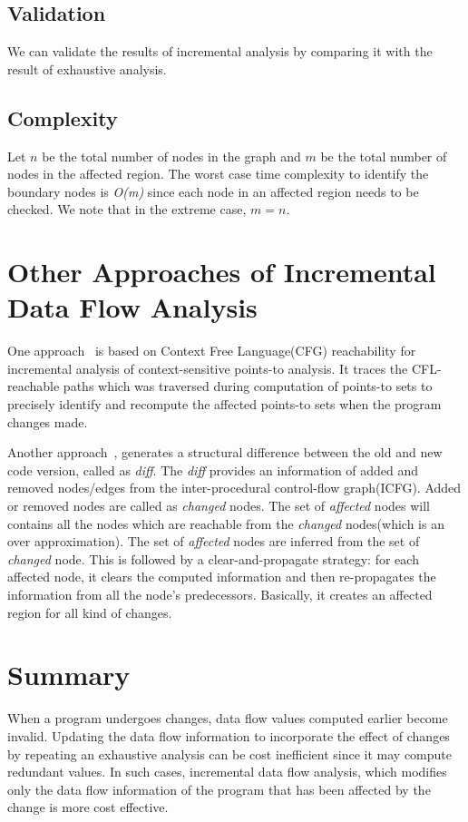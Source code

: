 \documentclass[11pt,a4paper,openright]{report}
\begin{document}

\subsection{Validation}
We can validate the results of incremental analysis by comparing it with the result of exhaustive analysis. 


\subsection{Complexity}
Let $n$ be the total number of nodes in the graph and $m$ be the total number of nodes in the affected region.
The worst case time complexity to identify the boundary nodes is \textit{O(m)} since each node in an affected region needs
to be checked.
We note that in the extreme case, $m = n$.

\section{Other Approaches of Incremental Data Flow Analysis}
One approach~\cite{inc1} is based on Context Free Language(CFG) reachability for incremental analysis of context-sensitive points-to analysis. It traces the CFL-reachable
paths which was traversed during computation of points-to sets to precisely identify and recompute the affected points-to sets when the program changes made. 

Another approach~\cite{inc2}, generates a structural difference between the old and new code version, called as \textit{diff}. The \textit{diff} 
provides an information of added and removed nodes/edges from the inter-procedural control-flow graph(ICFG). Added or removed nodes are called as
\textit{changed} nodes. The set of \textit{affected} nodes will contains all the nodes which are reachable from the \textit{changed} nodes(which is an over approximation). The set of \textit{affected} nodes are inferred from the set of \textit{changed} node. 
This is followed by a clear-and-propagate strategy: for each affected node, it clears the  computed information
and then re-propagates the information from all the node’s predecessors. Basically, it creates an affected region for all kind of changes.

\section{Summary}
When a program undergoes changes, data flow values computed earlier become invalid. Updating the data flow information to incorporate the effect
of changes by repeating an exhaustive analysis can be cost inefficient since it may compute redundant values. In such cases, incremental data flow
analysis, which modifies only the data flow information of the program that has been affected by the change is more cost effective.
\end{document}
